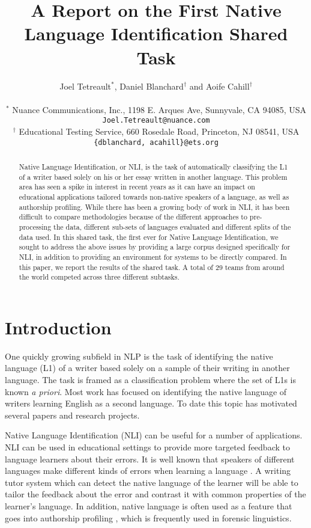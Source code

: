 \documentclass[11pt,letterpaper]{article}
\title{A Report on the First Native Language Identification Shared Task}
\author{Joel Tetreault$^{*}$, Daniel Blanchard$^{\dag}$ and Aoife Cahill$^{\dag}$\\
\\
  { $^{*}$ Nuance Communications, Inc., 1198 E. Arques Ave, Sunnyvale, CA 94085, USA}\\
  { {\tt Joel.Tetreault@nuance.com}} \\
  { $^{\dag}$ Educational Testing Service, 660 Rosedale Road, Princeton, NJ 08541, USA}\\
  { {\tt \{dblanchard, acahill\}@ets.org}}\\
}
\date{}
\begin{document}
\maketitle
\begin{abstract}
Native Language Identification, or NLI, is the task of automatically classifying
the L1 of a writer based solely on his or her essay written in another language.  This problem area has
seen a spike in interest in recent years as it can have an impact on
educational applications tailored towards non-native speakers of a language,
as well as authorship profiling.
While there has been a growing body of work in NLI, it has been difficult to compare
methodologies because of the different approaches to pre-processing the data, different
sub-sets of languages evaluated and different splits of the data used.
In this shared task, the first
ever for Native Language Identification, we sought to
address the above issues by providing a large corpus designed specifically for NLI,
in addition to providing an environment for systems to be directly compared.
In this paper, we report the results of the shared task.
A total of 29 teams from around the world competed across
three different subtasks.
\end{abstract}

\section{Introduction}
\label{sec-intro}
One quickly growing subfield in NLP is the task of identifying the native
language (L1) of a writer based solely on a sample of their writing in another language. The task
is framed as a classification problem where the set of L1s is known \emph{a priori}.
Most work has focused on identifying the native language of writers
learning English as a second language. To date this topic has motivated
several papers and research projects.

Native Language Identification (NLI) can be useful for a number of
applications. NLI can be used in educational settings to provide more
targeted feedback to language learners about their errors. It is
well known that speakers of different languages make different kinds of
errors when learning a language \cite{SwanSmith01}. A writing tutor system
which can detect the native language of the learner will be able to tailor
the feedback about the error and contrast it with common
properties of the learner's language. In addition, native language is
often used as a feature that goes into authorship profiling
\cite{estival2007author}, which is frequently used in forensic linguistics.
\end{document}
